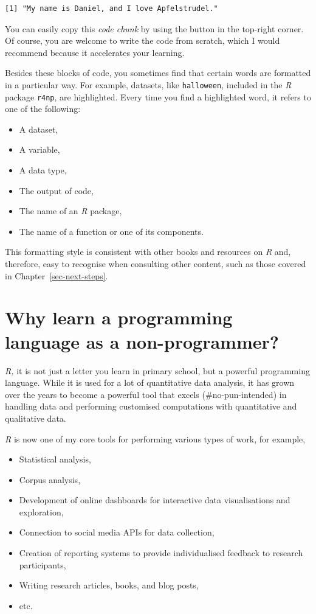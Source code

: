 \documentclass[
  letterpaper,
  DIV=11,
  numbers=noendperiod]{scrreprt}
\providecommand{\tightlist}{%
  \setlength{\itemsep}{0pt}\setlength{\parskip}{0pt}}\usepackage{longtable,booktabs,array}
\begin{document}
\begin{verbatim}
[1] "My name is Daniel, and I love Apfelstrudel."
\end{verbatim}

You can easily copy this \emph{code chunk} by using the button in the
top-right corner. Of course, you are welcome to write the code from
scratch, which I would recommend because it accelerates your learning.

Besides these blocks of code, you sometimes find that certain words are
formatted in a particular way. For example, datasets, like
\texttt{halloween}, included in the \emph{R} package \texttt{r4np}, are
highlighted. Every time you find a highlighted word, it refers to one of
the following:

\begin{itemize}
\item
  A dataset,
\item
  A variable,
\item
  A data type,
\item
  The output of code,
\item
  The name of an \emph{R} package,
\item
  The name of a function or one of its components.
\end{itemize}

This formatting style is consistent with other books and resources on
\emph{R} and, therefore, easy to recognise when consulting other
content, such as those covered in Chapter~\ref{sec-next-steps}.


\chapter{Why learn a programming language as a
non-programmer?}\label{sec-why-learn-a-programming-language-as-a-non-programmer}

\emph{R,} it is not just a letter you learn in primary school, but a
powerful programming language. While it is used for a lot of
quantitative data analysis, it has grown over the years to become a
powerful tool that excels (\#no-pun-intended) in handling data and
performing customised computations with quantitative and qualitative
data.

\emph{R} is now one of my core tools for performing various types of
work, for example,

\begin{itemize}
\tightlist
\item
  Statistical analysis,
\item
  Corpus analysis,
\item
  Development of online dashboards for interactive data visualisations
  and exploration,
\item
  Connection to social media APIs for data collection,
\item
  Creation of reporting systems to provide individualised feedback to
  research participants,
\item
  Writing research articles, books, and blog posts,
\item
  etc.
\end{itemize}
\end{document}
